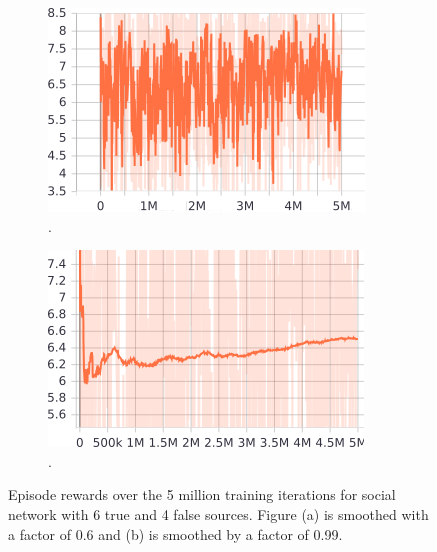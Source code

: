 \documentclass[11pt, a4paper]{article}
\begin{document}
\begin{figure}[h]
	\centering
	\begin{subfigure}{0.4\textwidth}
		\centering
		\includegraphics[width=\linewidth]{reward_notSmoothed.png}  
		\caption{.}
	\end{subfigure}
	\begin{subfigure}{0.4\textwidth}
		\centering
		\includegraphics[width=\linewidth]{reward_smoothed.png}  
		\caption{.}
	\end{subfigure}
	\caption{\label{fig:reward_tb}Episode rewards over the 5 million training iterations for social network with 6 true and 4 false sources. Figure (a) is smoothed with a factor of 0.6 and (b) is smoothed by a factor of 0.99.}
\end{figure}
\end{document}
